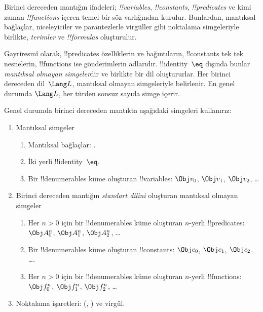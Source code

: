 \documentclass[../../../include/open-logic-section]{subfiles}
\begin{document}



Birinci dereceden mantığın ifadeleri; \emph{!!{variable}s},
\emph{!!{constant}s}, \emph{!!{predicate}s} ve kimi zaman
\emph{!!{function}s} içeren temel bir söz varlığından kurulur. Bunlardan,
mantıksal bağlaçlar, niceleyiciler ve parantezlerle virgüller gibi
noktalama simgeleriyle birlikte, \emph{terimler} ve
\emph{!!{formula}s} oluşturulur.

\begin{explain}
Gayriresmî olarak, !!{predicate}s özelliklerin ve bağıntıların,
!!{constant}s tek tek nesnelerin, !!{function}s ise gönderimlerin
adlarıdır. !!{identity}~$\eq$ dışında bunlar \emph{mantıksal olmayan
simgeler}dir ve birlikte bir dil oluştururlar. Her birinci dereceden
dil~$\Lang L$, mantıksal olmayan simgeleriyle belirlenir. En genel
durumda $\Lang L$, her türden sonsuz sayıda simge içerir.
\end{explain}

Genel durumda birinci dereceden mantıkta aşağıdaki simgeleri kullanırız:

\begin{enumerate}
\item Mantıksal simgeler
\begin{enumerate}
\item Mantıksal bağlaçlar:
  \startycommalist
  .
\item İki yerli !!{identity}~$\eq$.
\item Bir !!{denumerable}s küme oluşturan !!{variable}s: $\Obj v_0$, $\Obj v_1$, $\Obj
  v_2$, \dots
\end{enumerate}
\item Birinci dereceden mantığın \emph{standart dilini} oluşturan
  mantıksal olmayan simgeler
\begin{enumerate}
\item Her $n>0$ için bir !!{denumerable}s küme oluşturan $n$-yerli !!{predicate}s: $\Obj
  A^n_0$, $\Obj A^n_1$, $\Obj A^n_2$, \dots
\item Bir !!{denumerable}s küme oluşturan !!{constant}s: $\Obj c_0$, $\Obj c_1$, $\Obj
  c_2$, \dots.
\item Her $n>0$ için bir !!{denumerable}s küme oluşturan $n$-yerli !!{function}s:
  $\Obj f^n_0$, $\Obj f^n_1$, $\Obj f^n_2$, \dots
\end{enumerate}
\item Noktalama işaretleri: (, ) ve virgül.
\end{enumerate}
\end{document}
